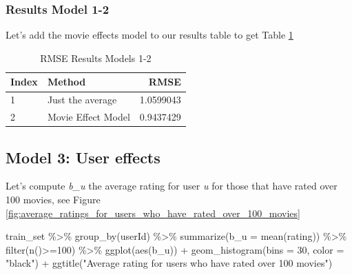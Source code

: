 \documentclass[
]{article}
\newenvironment{Shaded}{}{}
\newcommand{\AttributeTok}[1]{\textcolor[rgb]{0.49,0.56,0.16}{#1}}
\newcommand{\DecValTok}[1]{\textcolor[rgb]{0.25,0.63,0.44}{#1}}
\newcommand{\FunctionTok}[1]{\textcolor[rgb]{0.02,0.16,0.49}{#1}}
\newcommand{\NormalTok}[1]{#1}
\newcommand{\SpecialCharTok}[1]{\textcolor[rgb]{0.25,0.44,0.63}{#1}}
\newcommand{\StringTok}[1]{\textcolor[rgb]{0.25,0.44,0.63}{#1}}
\begin{document}
\hypertarget{results-model-1-2}{%
\subsubsection{Results Model 1-2}\label{results-model-1-2}}

Let's add the movie effects model to our results table to get Table
\ref{tbl:rmse_results_model_1-2}

\begin{table}[H]

\caption{\label{tab:me_4}RMSE Results Models 1-2\label{tbl:rmse_results_model_1-2}}
\centering
\fontsize{7}{9}\selectfont
\begin{tabular}[t]{llr}
\toprule
Index & Method & RMSE\\
\midrule
1 & Just the average & 1.0599043\\
2 & Movie Effect Model & 0.9437429\\
\bottomrule
\end{tabular}
\end{table}

\newpage

\hypertarget{model-3-user-effects}{%
\subsection{Model 3: User effects}\label{model-3-user-effects}}

Let's compute \emph{b\_u} the average rating for user \emph{u} for those
that have rated over 100 movies, see Figure
\ref{fig:average_ratings_for_users_who_have_rated_over_100_movies}

\begin{Shaded}
\begin{Highlighting}[]
\NormalTok{train\_set }\SpecialCharTok{\%\textgreater{}\%} 
  \FunctionTok{group\_by}\NormalTok{(userId) }\SpecialCharTok{\%\textgreater{}\%} 
  \FunctionTok{summarize}\NormalTok{(}\AttributeTok{b\_u =} \FunctionTok{mean}\NormalTok{(rating)) }\SpecialCharTok{\%\textgreater{}\%} 
  \FunctionTok{filter}\NormalTok{(}\FunctionTok{n}\NormalTok{()}\SpecialCharTok{\textgreater{}=}\DecValTok{100}\NormalTok{) }\SpecialCharTok{\%\textgreater{}\%}
  \FunctionTok{ggplot}\NormalTok{(}\FunctionTok{aes}\NormalTok{(b\_u)) }\SpecialCharTok{+} 
  \FunctionTok{geom\_histogram}\NormalTok{(}\AttributeTok{bins =} \DecValTok{30}\NormalTok{, }\AttributeTok{color =} \StringTok{"black"}\NormalTok{) }\SpecialCharTok{+} 
  \FunctionTok{ggtitle}\NormalTok{(}\StringTok{"Average rating for users who have rated over 100 movies"}\NormalTok{)}
\end{Highlighting}
\end{Shaded}
\end{document}
